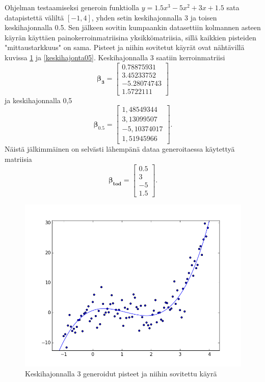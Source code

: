 \documentclass[12pt,a4paper,titlepage]{article}
\newcommand{\matr}[1]{\bm{#1}}
\begin{document}
Ohjelman testaamiseksi generoin funktiolla $y=1.5x^3-5x^2+3x+1.5$ sata datapistettä väliltä $[-1, 4]$, yhden setin keskihajonnalla 3 ja toisen keskihajonnalla 0.5. Sen jälkeen sovitin kumpaankin datasettiin kolmannen asteen käyrän käyttäen painokerroinmatriisina yksikkömatriisia, sillä kaikkien pisteiden "mittaustarkkuus" on sama. Pisteet ja niihin sovitetut käyrät ovat nähtävillä kuvissa \ref{keskihajonta3} ja \ref{keskihajonta05}. Keskihajonnalla 3 saatiin kerroinmatriisi
\begin{equation*}
	\matr{\beta_{3}}
	=
	\begin{bmatrix}
		0.78875931 \\
 		3.45233752 \\
 		-5.28074743 \\
		1.5722111
	\end{bmatrix}
\end{equation*}
ja keskihajonnalla 0,5
\begin{equation*}
	\matr{\beta_{0.5}}
	=
	\begin{bmatrix}
		1,48549344 \\
 		3,13099507 \\
 		-5,10374017 \\
  		1,51945966
  	\end{bmatrix}.
\end{equation*}
Näistä jälkimmäinen on selvästi lähempänä dataa generoitaessa käytettyä matriisia
\begin{equation*}
	\matr{\beta_{\text{tod}}}
	=
	\begin{bmatrix}
		0.5 \\
 		3 \\
 		-5 \\
  		1.5
  	\end{bmatrix}.
\end{equation*}


\begin{figure}
\centering
\includegraphics[width=\textwidth]{python/keskihajonta3.png}
\caption{Keskihajonnalla 3 generoidut pisteet ja niihin sovitettu käyrä}
\label{keskihajonta3}
\end{figure}
\end{document}
